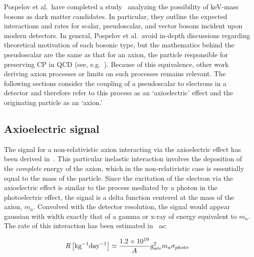 	Pospelov et al.~have completed a study~\cite{Pospelov:2008jk} analyzing the possibility of keV-mass bosons as dark matter candidates.  In particular, they outline the expected interactions and rates for scalar, pseudoscalar, and vector bosons incident upon modern detectors.  In general, Pospelov et al.~avoid in-depth discussions regarding theoretical motivation of each bosonic type, but the mathematics behind the pseudoscalar are the same as that for an axion, the particle responsible for preserving CP in QCD (see, e.g.~\cite{Amsler20081}).  Because of this equivalence, other work deriving axion processes or limits on such processes remains relevant.  The following sections consider the coupling of a pseudoscalar to electrons in a detector and therefore refer to this process as an `axioelectric' effect and the originating particle as an `axion.'  

	\subsection{Axioelectric signal}
	\label{sec:CalcLimitsOnHeavyAxionSignal}		

	The signal for a non-relativistic axion interacting via the axioelectric effect has been derived in~\cite{Pospelov:2008jk}.  This particular inelastic interaction involves the deposition of the \emph{complete} energy of the axion, which in the non-relativistic case is essentially equal to the mass of the particle.  Since the excitation of the electron via the axioelectric effect is similar to the process mediated by a photon in the photoelectric effect, the signal is a delta function centered at the mass of the axion, $m_{a}$.  Convolved with the detector resolution, the signal would appear gaussian with width exactly that of a gamma or x-ray of energy equivalent to $m_{a}$.  The rate of this interaction has been estimated in~\cite{Pospelov:2008jk} as:
	
		\begin{equation}
			R \left[ \text{kg}^{-1} \text{day}^{-1} \right]\simeq \frac{1.2\times 10^{19}}{A} g_{a\bar{e}e}^{2} m_a \sigma_{photo}
			\label{eqn:AxioelectricRate}
		\end{equation}


